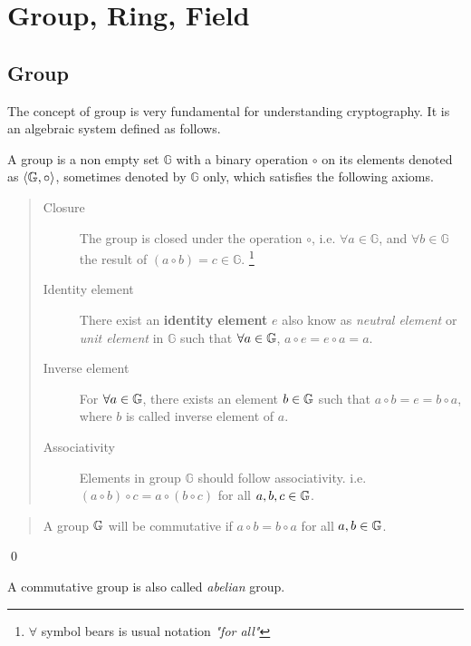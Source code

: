 \section{Group, Ring, Field}\label{group}
\subsection{Group}
The concept of group  is very fundamental for understanding cryptography. It is an algebraic system defined as follows.
\begin{definition}
A group  is a non empty set $\mathbb{G}$ with a binary operation $\circ$ on its elements denoted as  $\langle\mathbb{G}\index{group},\circ\rangle$,  sometimes denoted by   $\mathbb{G}$ only, which satisfies the following axioms.
\begin{quote}
	\begin{description}
		\item[Closure] The group is closed under the operation $\circ$, i.e.  $\forall a \in\mathbb{G}$, and $\forall b \in\mathbb{G}$ the result of $ (a\circ b) = c \in \mathbb{G}$. \footnote{$\forall$ symbol bears is usual notation \textit{"for all"} }
		
		\item[Identity element] There exist an \textbf{identity element } $e$ also know as \textit{neutral element} or \textit{unit element} in $\mathbb{G}$ such that $\forall a \in\mathbb{G} \index{group}$,  $a\circ e = e\circ a = a$.
		
		\item[Inverse element] For ${\forall}a \in\mathbb{G}\index{group}$, there exists an element $b\in\mathbb{G}\index{group}$ such that $a\circ b=e=b\circ a$, where $b$ is called inverse element of $a$.
		
		\item[Associativity] Elements in  group $\mathbb{G}$ should follow associativity. i.e. $(a\circ b)\circ c=a\circ (b\circ c)$ for all $ a,b,c\in\mathbb{G}\index{group}$.
		
\end{description}
\end{quote}
\end{definition}

\begin{definition} \hspace{0em}
\begin{quote}\begin{description}
A group  $\mathbb{G}\index{group}$ will be commutative if $a\circ b=b\circ a$ for all $a,b \in\mathbb{G}\index{group}$.
\end{description}\end{quote}
\qed
\end{definition}
A commutative group is also called \textit{abelian} group.

